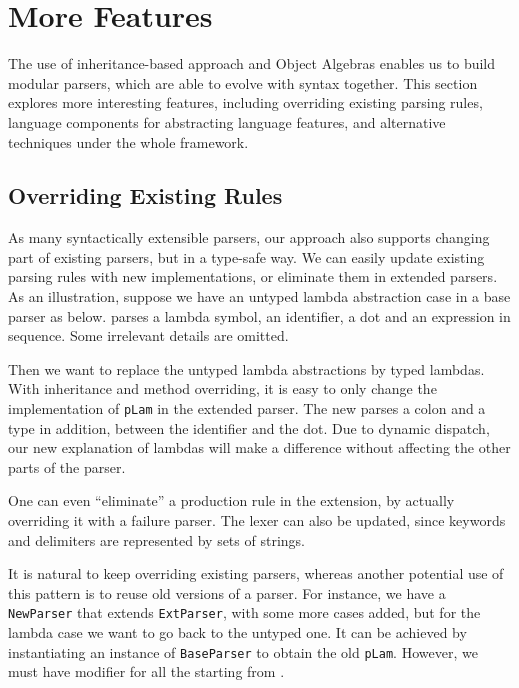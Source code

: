 \section{More Features}

The use of inheritance-based approach and Object Algebras enables us to build modular parsers, which are able to evolve with syntax together. This section explores more interesting features, including overriding existing parsing rules, language components for abstracting language features, and alternative techniques under the whole framework.

\subsection{Overriding Existing Rules}

As many syntactically extensible parsers, our approach also supports changing part of existing parsers, but in a type-safe way. We can easily update existing parsing rules with new implementations, or eliminate them in extended parsers. As an illustration, suppose we have an untyped lambda abstraction case in a base parser as below.  parses a lambda symbol, an identifier, a dot and an expression in sequence. Some irrelevant details are omitted.


Then we want to replace the untyped lambda abstractions by typed lambdas. With inheritance and method overriding, it is easy to only change the implementation of \lstinline{pLam} in the extended parser. The new  parses a colon and a type in addition, between the identifier and the dot. Due to dynamic dispatch, our new explanation of lambdas will make a difference without affecting the other parts of the parser.



One can even ``eliminate'' a production rule in the extension, by actually overriding it with a failure parser. The lexer can also be updated, since keywords and delimiters are represented by sets of strings.

It is natural to keep overriding existing parsers, whereas another potential use of this pattern is to reuse old versions of a parser. For instance,
we have a \lstinline{NewParser} that extends \lstinline{ExtParser}, with some more cases added, but for the lambda case we want to go back to the untyped one.
It can be achieved by instantiating an instance of \lstinline{BaseParser} to obtain the old \lstinline{pLam}. However, we must have  modifier for all the  starting from .

